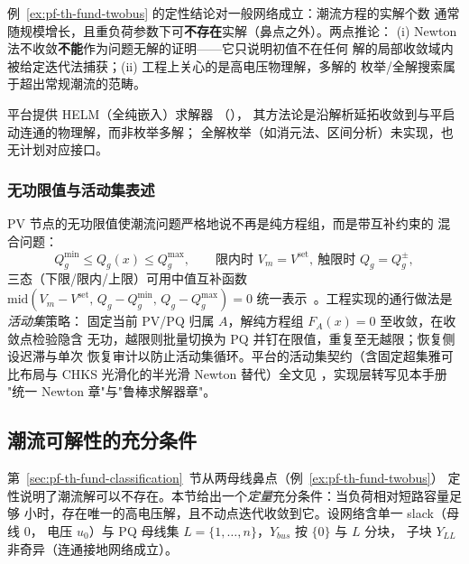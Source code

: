 \begin{remark}[一般网络的多解性与不可解性]\label{rem:pf-th-fund-multiplicity}
例~\ref{ex:pf-th-fund-twobus} 的定性结论对一般网络成立：潮流方程的实解个数
通常随规模增长，且重负荷参数下可\textbf{不存在}实解（鼻点之外）。两点推论：
(i) Newton 法不收敛\textbf{不能}作为问题无解的证明——它只说明初值不在任何
解的局部收敛域内被给定迭代法捕获；(ii) 工程上关心的是高电压物理解，多解的
枚举/全解搜索属于超出常规潮流的范畴。
\end{remark}

\begin{gapnote}
平台提供 HELM（全纯嵌入）求解器
（），
其方法论是沿解析延拓收敛到与平启动连通的物理解，而非枚举多解；
全解枚举（如消元法、区间分析）未实现，也无计划对应接口。
\end{gapnote}

\subsubsection{无功限值与活动集表述}

PV 节点的无功限值使潮流问题严格地说不再是纯方程组，而是带互补约束的
混合问题：
\begin{equation}
Q_g^{\min}\le Q_g(x)\le Q_g^{\max},\qquad
\text{限内时 }V_m=V^{\mathrm{set}},\ \text{触限时 }Q_g=Q_g^{\pm},
\label{eq:pf-th-fund-qlimit}
\end{equation}
三态（下限/限内/上限）可用中值互补函数
$\mathrm{mid}(V_m-V^{\mathrm{set}},\,Q_g-Q_g^{\min},\,Q_g-Q_g^{\max})=0$
统一表示~\cite{pff:hintermuller}。工程实现的通行做法是\emph{活动集}策略：
固定当前 PV/PQ 归属 $A$，解纯方程组 $F_A(x)=0$ 至收敛，在收敛点检验隐含
无功，越限则批量切换为 PQ 并钉在限值，重复至无越限；恢复侧设迟滞与单次
恢复审计以防止活动集循环。平台的活动集契约（含固定超集雅可比布局与
CHKS 光滑化的半光滑 Newton 替代）全文见
，实现层转写见本手册
"统一 Newton 章"与"鲁棒求解器章"。

\subsection{潮流可解性的充分条件}\label{sec:pf-th-fund-solvability}

第~\ref{sec:pf-th-fund-classification}~节从两母线鼻点（例~\ref{ex:pf-th-fund-twobus}）
定性说明了潮流解可以不存在。本节给出一个\emph{定量}充分条件：当负荷相对短路容量足够
小时，存在唯一的高电压解，且不动点迭代收敛到它。设网络含单一 slack（母线 $0$，
电压 $u_0$）与 PQ 母线集 $L=\{1,\dots,n\}$，$Y_{bus}$ 按 $\{0\}$ 与 $L$ 分块，
子块 $Y_{LL}$ 非奇异（连通接地网络成立）。


